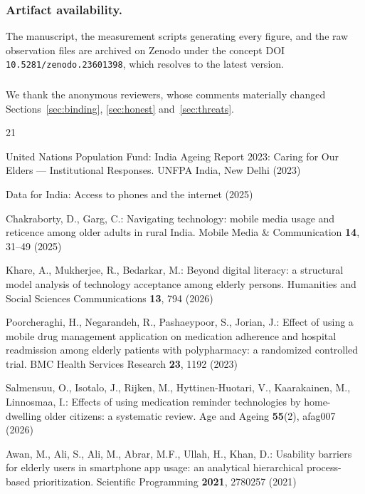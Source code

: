 \documentclass[runningheads,a4paper]{llncs}
\begin{document}
\subsubsection{Artifact availability.} The manuscript, the measurement scripts generating
every figure, and the raw observation files are archived on Zenodo under the concept DOI
\texttt{10.5281/zenodo.23601398}, which resolves to the latest version.

\subsubsection{\ackname} We thank the anonymous reviewers, whose comments materially
changed Sections~\ref{sec:binding}, \ref{sec:honest} and~\ref{sec:threats}.

\begin{thebibliography}{21}

United Nations Population Fund: India Ageing Report 2023: Caring for Our Elders ---
Institutional Responses. UNFPA India, New Delhi (2023)

Data for India: Access to phones and the internet (2025)

Chakraborty, D., Garg, C.: Navigating technology: mobile media usage and reticence among
older adults in rural India. Mobile Media \& Communication \textbf{14}, 31--49 (2025)

Khare, A., Mukherjee, R., Bedarkar, M.: Beyond digital literacy: a structural model
analysis of technology acceptance among elderly persons. Humanities and Social Sciences
Communications \textbf{13}, 794 (2026)

Poorcheraghi, H., Negarandeh, R., Pashaeypoor, S., Jorian, J.: Effect of using a mobile
drug management application on medication adherence and hospital readmission among elderly
patients with polypharmacy: a randomized controlled trial. BMC Health Services Research
\textbf{23}, 1192 (2023)

Salmensuu, O., Isotalo, J., Rijken, M., Hyttinen-Huotari, V., Kaarakainen, M., Linnosmaa,
I.: Effects of using medication reminder technologies by home-dwelling older citizens: a
systematic review. Age and Ageing \textbf{55}(2), afag007 (2026)

Awan, M., Ali, S., Ali, M., Abrar, M.F., Ullah, H., Khan, D.: Usability barriers for
elderly users in smartphone app usage: an analytical hierarchical process-based
prioritization. Scientific Programming \textbf{2021}, 2780257 (2021)


\end{thebibliography}
\end{document}
